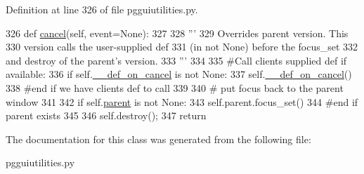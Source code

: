 Definition at line 326 of file pgguiutilities.\+py.


\begin{DoxyCode}
326     \textcolor{keyword}{def }\hyperlink{classnegui_1_1pgguiutilities_1_1PGGUIMessageWaitForResultsAndActionOnCancel_a70645e4aec555b0e813ff42dae5c1788}{cancel}(self, event=None):
327 
328         \textcolor{stringliteral}{'''}
329 \textcolor{stringliteral}{        Overrides parent version.  This}
330 \textcolor{stringliteral}{        version calls the user-supplied def}
331 \textcolor{stringliteral}{        (in not None) before the focus\_set}
332 \textcolor{stringliteral}{        and destroy of the parent's version.}
333 \textcolor{stringliteral}{        '''}
334 
335         \textcolor{comment}{#Call clients supplied def if available:}
336         \textcolor{keywordflow}{if} self.\hyperlink{classnegui_1_1pgguiutilities_1_1PGGUIMessageWaitForResultsAndActionOnCancel_a827d0315deabf58706988f5f04d2b977}{\_\_def\_on\_cancel} \textcolor{keywordflow}{is} \textcolor{keywordflow}{not} \textcolor{keywordtype}{None}:
337             self.\hyperlink{classnegui_1_1pgguiutilities_1_1PGGUIMessageWaitForResultsAndActionOnCancel_a827d0315deabf58706988f5f04d2b977}{\_\_def\_on\_cancel}()
338         \textcolor{comment}{#end if we have clients def to call}
339 
340         \textcolor{comment}{# put focus back to the parent window}
341     
342         \textcolor{keywordflow}{if} self.\hyperlink{classnegui_1_1pgguiutilities_1_1PGGUIMessageWaitForResultsAndActionOnCancel_a521c6b40ad05354b050710ac78203481}{parent} \textcolor{keywordflow}{is} \textcolor{keywordflow}{not} \textcolor{keywordtype}{None}:
343             self.parent.focus\_set()
344         \textcolor{comment}{#end if parent exists}
345 
346         self.destroy();
347         \textcolor{keywordflow}{return}
\end{DoxyCode}


The documentation for this class was generated from the following file\+:\begin{DoxyCompactItemize}
\item 
pgguiutilities.\+py\end{DoxyCompactItemize}
